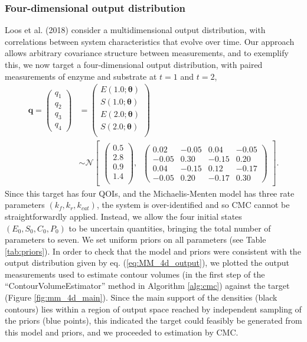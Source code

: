 \subsubsection{Four-dimensional output distribution}
Loos et al. (2018) consider a multidimensional output distribution, with correlations between system characteristics that evolve over time. Our approach allows arbitrary covariance structure between measurements, and to exemplify this, we now target a four-dimensional output distribution, with paired measurements of enzyme and substrate at $t=1$ and $t=2$,
%
\begin{equation}\label{eq:MM_4d_output}
\begin{aligned}
\boldsymbol{q} = \begin{pmatrix} q_1 \\ q_2 \\ q_3 \\ q_4 \end{pmatrix} &=
\begin{pmatrix}
E(1.0; \boldsymbol{\theta})\\
S(1.0; \boldsymbol{\theta})\\
E(2.0; \boldsymbol{\theta})\\
S(2.0; \boldsymbol{\theta})\\
\end{pmatrix}
\\
&\sim  \mathcal{N}
\begin{bmatrix}
\begin{pmatrix}
0.5\\
2.8\\
0.9\\
1.4\\
\end{pmatrix}, \;\;
\begin{pmatrix}
0.02 &  -0.05 &  0.04 & -0.05\\
-0.05 & 0.30  & -0.15 & 0.20\\
0.04 & -0.15  & 0.12  &  -0.17\\
-0.05 & 0.20 & -0.17 & 0.30
\end{pmatrix}
\end{bmatrix}.
\end{aligned}
\end{equation}
%
Since this target has four QOIs, and the Michaelis-Menten model has three rate parameters $(k_f,k_r,k_{cat})$, the system is over-identified and so CMC cannot be straightforwardly applied. Instead, we allow the four initial states $(E_0, S_0, C_0, P_0)$ to be uncertain quantities, bringing the total number of parameters to seven. We set uniform priors on all parameters (see Table \ref{tab:priors}). In order to check that the model and priors were consistent with the output distribution given by eq. (\ref{eq:MM_4d_output}), we plotted the output measurements used to estimate contour volumes (in the first step of the ``ContourVolumeEstimator'' method in Algorithm \ref{alg:cmc}) against the target (Figure \ref{fig:mm_4d_main}). Since the main support of the densities (black contours) lies within a region of output space reached by independent sampling of the priors (blue points), this indicated the target could feasibly be generated from this model and priors, and we proceeded to estimation by CMC.

